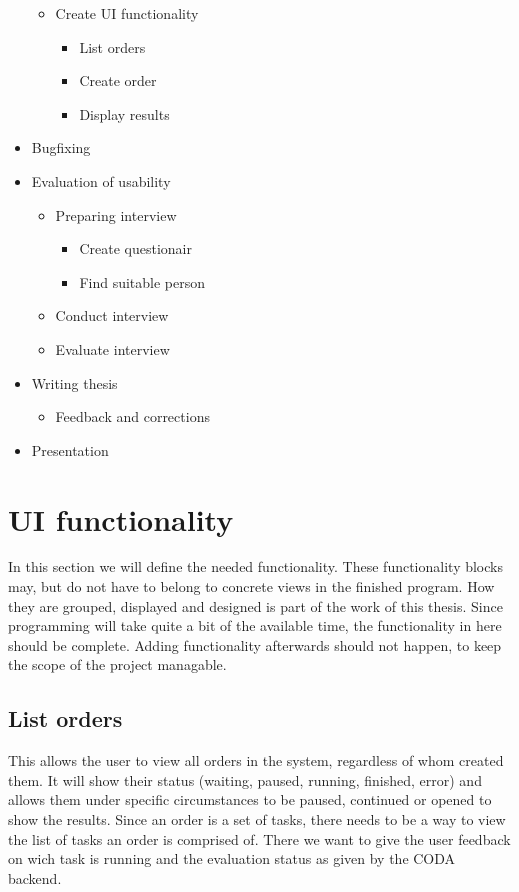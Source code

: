 \documentclass[12pt,a4paper,titlepage,oneside,BCOR1cm]{scrreprt}
\begin{document}
\begin{itemize}
\begin{itemize}
\item Create UI functionality
\begin{itemize}
\item List orders
\item Create order
\item Display results
\end{itemize}
\end{itemize}
\item Bugfixing
\item Evaluation of usability 
\begin{itemize}
\item Preparing interview
\begin{itemize}
\item Create questionair
\item Find suitable person
\end{itemize}
\item Conduct interview
\item Evaluate interview
\end{itemize}

\item Writing thesis
\begin{itemize}
\item Feedback and corrections
\end{itemize}
\item Presentation
\end{itemize}

\section{UI functionality}
In this section we will define the needed functionality. 
These functionality blocks may, but do not have to belong to concrete views in the finished program. 
How they are grouped, displayed and designed is part of the work of this thesis.
Since programming will take quite a bit of the available time, the functionality in here should be complete. 
Adding functionality afterwards should not happen, to keep the scope of the project managable.

\subsection{List orders}
This allows the user to view all orders in the system, regardless of whom created them. 
It will show their status (waiting, paused, running, finished, error) and allows them under specific circumstances to be paused, continued or opened to show the results.
Since an order is a set of tasks, there needs to be a way to view the list of tasks an order is comprised of. 
There we want to give the user feedback on wich task is running and the evaluation status as given by the CODA backend. 
\end{document}
